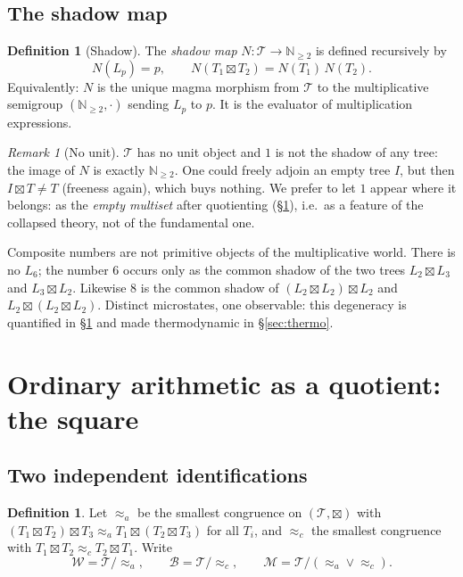 \documentclass[11pt]{article}
\newcommand{\cT}{\mathcal{T}}   %
\newcommand{\cW}{\mathcal{W}}   %
\newcommand{\cB}{\mathcal{B}}   %
\newcommand{\cM}{\mathcal{M}}   %
\newcommand{\NN}{\mathbb{N}}
\numberwithin{equation}{section}
\theoremstyle{plain}
\theoremstyle{definition}
\newtheorem{definition}[theorem]{Definition}
\theoremstyle{remark}
\newtheorem{remark}[theorem]{Remark}
\begin{document}
\subsection{The shadow map}

\begin{definition}[Shadow]\label{def:shadow}
The \emph{shadow map} $N \colon \cT \to \NN_{\ge 2}$ is defined recursively by
\[
N(L_p) = p, \qquad N(T_1 \boxtimes T_2) = N(T_1)\,N(T_2).
\]
Equivalently: $N$ is the unique magma morphism from $\cT$ to the multiplicative
semigroup $(\NN_{\ge2},\cdot)$ sending $L_p$ to $p$. It is the evaluator of
multiplication expressions.
\end{definition}

\begin{remark}[No unit]\label{rem:nounit}
$\cT$ has no unit object and $1$ is not the shadow of any tree: the image of $N$ is
exactly $\NN_{\ge 2}$. One could freely adjoin an empty tree $I$, but then
$I \boxtimes T \neq T$ (freeness again), which buys nothing. We prefer to let $1$ appear
where it belongs: as the \emph{empty multiset} after quotienting
(\S\ref{sec:square}), i.e.\ as a feature of the collapsed theory, not of the fundamental
one.
\end{remark}

Composite numbers are not primitive objects of the multiplicative world. There is no
$L_6$; the number $6$ occurs only as the common shadow of the two trees
$L_2\boxtimes L_3$ and $L_3\boxtimes L_2$. Likewise $8$ is the common shadow of
$(L_2\boxtimes L_2)\boxtimes L_2$ and $L_2\boxtimes(L_2\boxtimes L_2)$. Distinct
microstates, one observable: this degeneracy is quantified in \S\ref{sec:square} and
made thermodynamic in \S\ref{sec:thermo}.

\section{Ordinary arithmetic as a quotient: the square}\label{sec:square}

\subsection{Two independent identifications}

\begin{definition}\label{def:congruences}
Let $\approx_a$ be the smallest congruence on $(\cT,\boxtimes)$ with
$(T_1\boxtimes T_2)\boxtimes T_3 \approx_a T_1\boxtimes(T_2\boxtimes T_3)$ for all
$T_i$, and $\approx_c$ the smallest congruence with
$T_1\boxtimes T_2 \approx_c T_2\boxtimes T_1$. Write
\[
\cW = \cT/\!\approx_a, \qquad
\cB = \cT/\!\approx_c, \qquad
\cM = \cT/(\approx_a \vee \approx_c).
\]
\end{definition}
\end{document}
